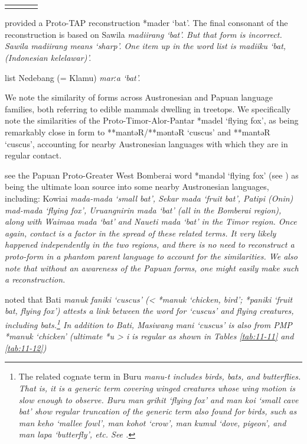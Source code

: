\begin{table}[h]
\begin{threeparttable}
\begin{tabularx}{\textwidth}{l|ll>{\raggedright\arraybackslash}X}
\lspbottomrule
	\end{tabularx}
		\begin{tablenotes}\tnsize
			\item[†]	{\citet[269]{Schapper2011} provided a Proto-TAP reconstruction *mader ‘bat’.
								The final consonant of the reconstruction is based on Sawila \it{madiirang} ‘bat’.
								But that form is incorrect.
								Sawila \it{madiirang} means ‘sharp’.
								One item up in the word list is \it{madiiku} ‘bat, (Indonesian \it{kelelawar})’.}
			\item[‡]	{\citet[493]{UsherSchapper2022} list Nedebang (= Klamu) \it{marːa} ‘bat’.}
		\end{tablenotes}
	\end{threeparttable}
\end{table}

We note the similarity of forms across Austronesian
and Papuan language families,
both referring to edible mammals dwelling in treetops.
We specifically note the similarities of the Proto-Timor-Alor-Pantar
*madel ‘flying fox’, as being remarkably close in form to  **mantəR/**məntəR
‘cuscus’ and  **mantəR ‘cuscus’,
accounting for nearby Austronesian languages with which they
are in regular contact.

\citet[486]{UsherSchapper2022} see the Papuan Proto-Greater West
Bomberai word *mandəl ‘flying fox’ (see ) as being
the ultimate loan source into some nearby Austronesian languages,
including: Kowiai \it{mada-mada} ‘small bat’,
Sekar \it{mada} ‘fruit bat’,
Patipi (Onin) \it{mad-mada} ‘flying fox’,
Uruangnirin \it{mada} ‘bat’ (all in the Bomberai region),
along with Waima{\Q}a \it{mada} ‘bat’
and Naueti \it{mada} ‘bat’ in the Timor region.
Once again, contact is a factor in the spread of these related terms.
It very likely happened independently in the two regions,
and there is no need to reconstruct a proto-form in a phantom
parent language to account for the similarities.
We also note that without an awareness of the Papuan forms,
one might easily make such a reconstruction.

\citet[269f]{Schapper2011} noted that Bati \it{manuk faniki} ‘cuscus’
(< *manuk ‘chicken, bird’; *paniki ‘fruit bat,
flying fox’) attests a link between the word for `cuscus'
and flying creatures, including bats.\footnote{
		The related cognate term in Buru \it{manu-t}
		includes birds, bats, and butterflies.
		That is, it is a generic term covering winged creatures whose
		wing motion is slow enough to observe.
		Buru \it{man grihit} ‘flying fox’
		and \it{man koi} ‘small cave bat’ show regular truncation of
		the generic term also found for birds,
		such as \it{man keho} ‘mallee fowl’,
		\it{man kohot} ‘crow’, \it{man kumul} ‘dove,
		pigeon’, and \it{man lapa} ‘butterfly’, etc.
		See \citet{GrimesGrimes2020}.}
In addition to Bati, Masiwang \it{mani} ‘cuscus’
is also from PMP *manuk `chicken'
(ultimate *u > \it{i} is regular as shown in Tables
\ref{tab:11-11} and \ref{tab:11-12})

